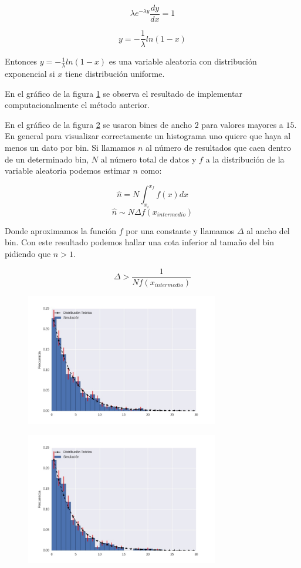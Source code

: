 \documentclass{article}
\begin{document}
$$\lambda e^{-\lambda y} \frac{dy}{dx} = 1 $$

$$ y = -\frac{1}{\lambda} ln(1-x)$$

Entonces $y = -\frac{1}{\lambda} ln(1-x)$ es una variable aleatoria con distribución exponencial si $x$ tiene distribución uniforme.

En el gráfico de la figura \ref{fig:ej9b_1} se observa el resultado de implementar computacionalmente el método anterior.

En el gráfico de la figura \ref{fig:ej9b_2} se usaron bines de ancho $2$ para valores mayores a $15$.
En general para visualizar correctamente un histograma uno quiere que haya al menos un dato por bin. 
Si llamamos $n$ al número de resultados que caen dentro de un determinado bin, $N$ al número total de datos y $f$ a la distribución de la variable aleatoria podemos estimar $n$ como:

$$ \hat n = N \int_{x_i}^{x_f} f(x) dx$$
$$ \hat n \sim N \Delta f(x_{intermedio}) $$

Donde aproximamos la función $f$ por una constante y llamamos $\Delta$ al ancho del bin.
Con este resultado podemos hallar una cota inferior al tamaño del bin pidiendo que $n>1$.

$$  \Delta > \frac{1}{N f(x_{intermedio})} $$

\begin{figure}
\centering
\includegraphics[width=0.75\textwidth]{ej9b_1.jpg}
\caption[]{}
\label{fig:ej9b_1}
\end{figure}

\begin{figure}
\centering
\includegraphics[width=0.75\textwidth]{ej9b_2.jpg}
\caption[]{}
\label{fig:ej9b_2}
\end{figure}
\end{document}
